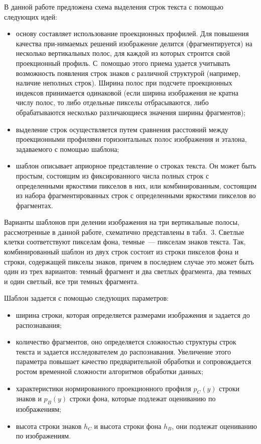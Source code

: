 \begin{multicols}{2}
      В данной работе предложена схема выделения строк текста с помощью следующих 
идей:
      \begin{itemize}
\item основу составляет использование проекционных профилей. Для повышения 
качества при-\linebreak нимаемых решений изоб\-ра\-же\-ние делится (фраг\-мен\-ти\-ру\-ет\-ся) на несколько 
вертикальных полос, для каждой из которых строится свой проекционный профиль. 
С~помощью этого приема удается учитывать возможность появления строк знаков с 
различной структурой (на\-при\-мер, наличие неполных строк). Ширина полос при 
подсчете проекционных индексов принимается одинаковой (если ширина изоб\-ра\-же\-ния 
не кратна числу полос, то либо отдельные пикселы отбрасываются, либо 
обрабатываются несколько различающиеся значения ширины фрагментов);
\item выделение строк осуществляется путем сравнения расстояний между 
проекционными профилями горизонтальных полос изоб\-ра\-же\-ния и эталона, 
задаваемого с помощью шаблона;
\item шаблон описывает априорное представление о строках текста. Он может быть 
простым, состоящим из фиксированного числа полных строк с определенными 
яркостями пикселов в них, или комбинированным, состоящим из набора 
фрагментированных строк с определенными яркостями пикселов во фрагментах.
\end{itemize}

      Варианты шаблонов при делении изображения на три вертикальные полосы, 
рассмотренные в данной работе, схематично представлены в табл.~3. Светлые клетки 
соответствуют пикселам фона, темные~--- пикселам знаков текста. Так, комбинированный 
шаблон из двух строк состоит из строки пикселов фона и строки, содержащей пикселы 
знаков, причем в последнем случае это может быть один из трех вариантов: темный 
фрагмент и два светлых фрагмента, два темных и один светлый, все три темных 
фрагмента. 

      
      
      Шаблон задается с помощью следующих параметров: 
      \begin{itemize}
\item ширина строки, которая определяется размерами изображения и задается до 
распознавания;
\item количество фрагментов, оно определяется сложностью структуры строк текста и 
задается исследователем до распознавания. Увеличение этого параметра повышает 
качество предварительной обработки и сопровождается ростом временной сложности 
алгоритмов обработки данных;
\item характеристики нормированного проекционного профиля $p_C(y)$ строки знаков 
и $p_B(y)$ строки фона, которые подлежат оцениванию по изображениям;
\item высота строки знаков $h_C$ и высота строки фона $h_B$, они подлежат 
оцениванию по изображениям.
\end{itemize}
      

\end{multicols}
